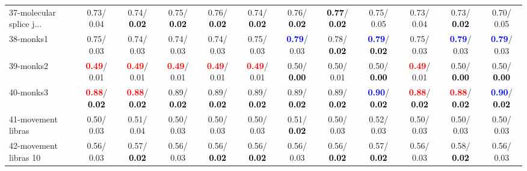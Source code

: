 \begin{table}[h]
\begin{center}
{\begin{tabular}{lc|c|c|c|c|c|c|c|c|c|c}
37-molecular splice j... &   0.73/  0.04 &   0.74/\textcolor{black}{\textbf{  0.02}} &   0.75/\textcolor{black}{\textbf{  0.02}} &   0.76/\textcolor{black}{\textbf{  0.02}} &   0.74/\textcolor{black}{\textbf{  0.02}} &   0.76/\textcolor{black}{\textbf{  0.02}} & \textcolor{black}{\textbf{  0.77}}/\textcolor{black}{\textbf{  0.02}} &   0.75/  0.05 &   0.73/  0.04 &   0.73/\textcolor{black}{\textbf{  0.02}} &   0.70/  0.05 \\
38-monks1 &   0.75/  0.03 &   0.74/  0.03 &   0.74/  0.03 &   0.74/  0.03 &   0.75/  0.03 & \textcolor{blue}{\textbf{  0.79}}/  0.03 &   0.78/\textcolor{black}{\textbf{  0.02}} & \textcolor{blue}{\textbf{  0.79}}/\textcolor{black}{\textbf{  0.02}} &   0.75/  0.03 & \textcolor{blue}{\textbf{  0.79}}/  0.03 & \textcolor{blue}{\textbf{  0.79}}/  0.03 \\
39-monks2 & \textcolor{red}{\textbf{  0.49}}/  0.01 & \textcolor{red}{\textbf{  0.49}}/  0.01 & \textcolor{red}{\textbf{  0.49}}/  0.01 & \textcolor{red}{\textbf{  0.49}}/  0.01 & \textcolor{red}{\textbf{  0.49}}/  0.01 &   0.50/\textcolor{black}{\textbf{  0.00}} &   0.50/  0.01 &   0.50/\textcolor{black}{\textbf{  0.00}} & \textcolor{red}{\textbf{  0.49}}/  0.01 &   0.50/\textcolor{black}{\textbf{  0.00}} &   0.50/\textcolor{black}{\textbf{  0.00}} \\ \hline
40-monks3 & \textcolor{red}{\textbf{  0.88}}/\textcolor{black}{\textbf{  0.02}} & \textcolor{red}{\textbf{  0.88}}/\textcolor{black}{\textbf{  0.02}} &   0.89/\textcolor{black}{\textbf{  0.02}} &   0.89/\textcolor{black}{\textbf{  0.02}} &   0.89/\textcolor{black}{\textbf{  0.02}} &   0.89/\textcolor{black}{\textbf{  0.02}} &   0.89/\textcolor{black}{\textbf{  0.02}} & \textcolor{blue}{\textbf{  0.90}}/\textcolor{black}{\textbf{  0.02}} & \textcolor{red}{\textbf{  0.88}}/\textcolor{black}{\textbf{  0.02}} & \textcolor{red}{\textbf{  0.88}}/\textcolor{black}{\textbf{  0.02}} & \textcolor{blue}{\textbf{  0.90}}/\textcolor{black}{\textbf{  0.02}} \\
41-movement libras &   0.50/  0.03 &   0.51/  0.04 &   0.50/  0.03 &   0.50/  0.03 &   0.50/  0.03 &   0.51/\textcolor{black}{\textbf{  0.02}} &   0.50/  0.03 &   0.52/  0.03 &   0.50/  0.03 &   0.50/  0.03 &   0.50/  0.03 \\
42-movement libras 10 &   0.56/  0.03 &   0.57/\textcolor{black}{\textbf{  0.02}} &   0.56/  0.03 &   0.56/\textcolor{black}{\textbf{  0.02}} &   0.56/\textcolor{black}{\textbf{  0.02}} &   0.56/  0.03 &   0.56/\textcolor{black}{\textbf{  0.02}} &   0.57/\textcolor{black}{\textbf{  0.02}} &   0.56/  0.03 &   0.58/\textcolor{black}{\textbf{  0.02}} &   0.56/  0.03 \\

\end{tabular}}
\end{center}
\end{table}
